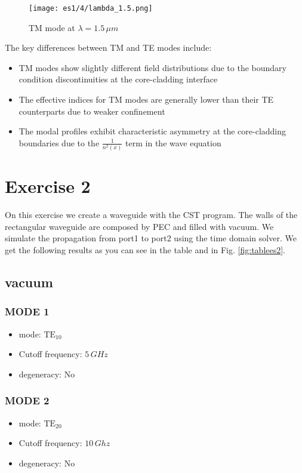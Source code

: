 \documentclass{article}
\begin{document}
\begin{figure}[h]
\centering
\texttt{[image: es1/4/lambda\_1.5.png]}
\caption{TM mode at $\lambda = 1.5\,\mu m$}
\label{fig:TM_mode_15}
\end{figure}

The key differences between TM and TE modes include:
\begin{itemize}
\item TM modes show slightly different field distributions due to the boundary condition discontinuities at the core-cladding interface
\item The effective indices for TM modes are generally lower than their TE counterparts due to weaker confinement
\item The modal profiles exhibit characteristic asymmetry at the core-cladding boundaries due to the $\frac{1}{n^2(x)}$ term in the wave equation
\end{itemize}



\section{Exercise 2}
On this exercise we create a waveguide with the CST program. The walls of the rectangular waveguide are composed by PEC and filled with vacuum. We simulate the propagation from port1 to port2 using the time domain solver. We get the following results as you can see in the table and in Fig. \ref{fig:tablees2}. 
\subsection{vacuum}
\subsubsection{MODE 1}
\begin{itemize}
    \item mode: $\text{TE}_{10}$
    \item Cutoff frequency: $5 \, GHz$
    \item degeneracy: No
\end{itemize}

\subsubsection{MODE 2}
\begin{itemize}
    \item mode: $\text{TE}_{20}$
    \item Cutoff frequency: $10 \, Ghz$
    \item degeneracy: No
\end{itemize}
\end{document}
